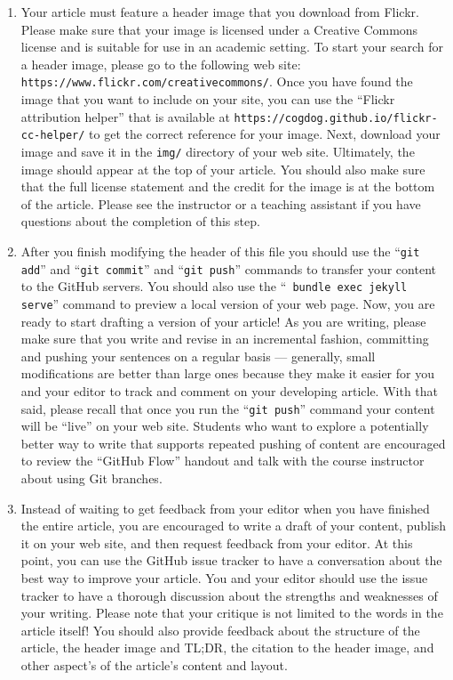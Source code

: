 \begin{enumerate}
  \item Your article must feature a header image that you download from Flickr. Please make sure that your image is
    licensed under a Creative Commons license and is suitable for use in an academic setting. To start your search for a
    header image, please go to the following web site: {\tt https://www.flickr.com/creativecommons/}. Once you have
    found the image that you want to include on your site, you can use the ``Flickr attribution helper'' that is
    available at {\tt https://cogdog.github.io/flickr-cc-helper/} to get the correct reference for your image. Next,
    download your image and save it in the {\tt img/} directory of your web site. Ultimately, the image should appear at
    the top of your article. You should also make sure that the full license statement and the credit for the image is
    at the bottom of the article. Please see the instructor or a teaching assistant if you have questions about the
    completion of this step.

  \item After you finish modifying the header of this file you should use the ``{\tt git add}'' and ``{\tt git commit}''
    and ``{\tt git push}'' commands to transfer your content to the GitHub servers. You should also use the ``{\tt
    bundle exec jekyll serve}'' command to preview a local version of your web page. Now, you are ready to start
    drafting a version of your article! As you are writing, please make sure that you write and revise in an incremental
    fashion, committing and pushing your sentences on a regular basis --- generally, small modifications are better than
    large ones because they make it easier for you and your editor to track and comment on your developing article. With
    that said, please recall that once you run the ``{\tt git push}'' command your content will be ``live'' on your web
    site. Students who want to explore a potentially better way to write that supports repeated pushing of content are
    encouraged to review the ``GitHub Flow'' handout and talk with the course instructor about using Git branches.

  \item Instead of waiting to get feedback from your editor when you have finished the entire article, you are
    encouraged to write a draft of your content, publish it on your web site, and then request feedback from your
    editor. At this point, you can use the GitHub issue tracker to have a conversation about the best way to improve
    your article. You and your editor should use the issue tracker to have a thorough discussion about the strengths and
    weaknesses of your writing. Please note that your critique is not limited to the words in the article itself! You
    should also provide feedback about the structure of the article, the header image and TL;DR, the citation to the
    header image, and other aspect's of the article's content and layout.


\end{enumerate}
